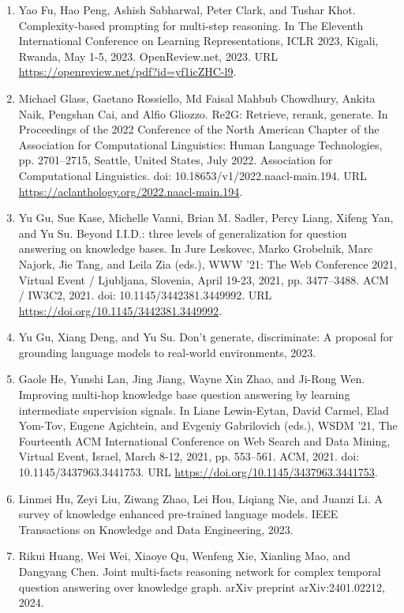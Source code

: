 \documentclass[11pt,UTF8,fontset=fandol]{ctexart}
\begin{document}
\begin{enumerate}[leftmargin=2em]
\item Yao Fu, Hao Peng, Ashish Sabharwal, Peter Clark, and Tushar Khot. Complexity-based prompting for multi-step reasoning. In The Eleventh International Conference on Learning Representations, ICLR 2023, Kigali, Rwanda, May 1-5, 2023. OpenReview.net, 2023. URL \url{https://openreview.net/pdf?id=yf1icZHC-l9}.
\item Michael Glass, Gaetano Rossiello, Md Faisal Mahbub Chowdhury, Ankita Naik, Pengshan Cai, and Alfio Gliozzo. Re2G: Retrieve, rerank, generate. In Proceedings of the 2022 Conference of the North American Chapter of the Association for Computational Linguistics: Human Language Technologies, pp. 2701--2715, Seattle, United States, July 2022. Association for Computational Linguistics. doi: 10.18653/v1/2022.naacl-main.194. URL \url{https://aclanthology.org/2022.naacl-main.194}.
\item Yu Gu, Sue Kase, Michelle Vanni, Brian M. Sadler, Percy Liang, Xifeng Yan, and Yu Su. Beyond I.I.D.: three levels of generalization for question answering on knowledge bases. In Jure Leskovec, Marko Grobelnik, Marc Najork, Jie Tang, and Leila Zia (eds.), WWW '21: The Web Conference 2021, Virtual Event / Ljubljana, Slovenia, April 19-23, 2021, pp. 3477--3488. ACM / IW3C2, 2021. doi: 10.1145/3442381.3449992. URL \url{https://doi.org/10.1145/3442381.3449992}.
\item Yu Gu, Xiang Deng, and Yu Su. Don't generate, discriminate: A proposal for grounding language models to real-world environments, 2023.
\item Gaole He, Yunshi Lan, Jing Jiang, Wayne Xin Zhao, and Ji-Rong Wen. Improving multi-hop knowledge base question answering by learning intermediate supervision signals. In Liane Lewin-Eytan, David Carmel, Elad Yom-Tov, Eugene Agichtein, and Evgeniy Gabrilovich (eds.), WSDM '21, The Fourteenth ACM International Conference on Web Search and Data Mining, Virtual Event, Israel, March 8-12, 2021, pp. 553--561. ACM, 2021. doi: 10.1145/3437963.3441753. URL \url{https://doi.org/10.1145/3437963.3441753}.
\item Linmei Hu, Zeyi Liu, Ziwang Zhao, Lei Hou, Liqiang Nie, and Juanzi Li. A survey of knowledge enhanced pre-trained language models. IEEE Transactions on Knowledge and Data Engineering, 2023.
\item Rikui Huang, Wei Wei, Xiaoye Qu, Wenfeng Xie, Xianling Mao, and Dangyang Chen. Joint multi-facts reasoning network for complex temporal question answering over knowledge graph. arXiv preprint arXiv:2401.02212, 2024.

\end{enumerate}
\end{document}
